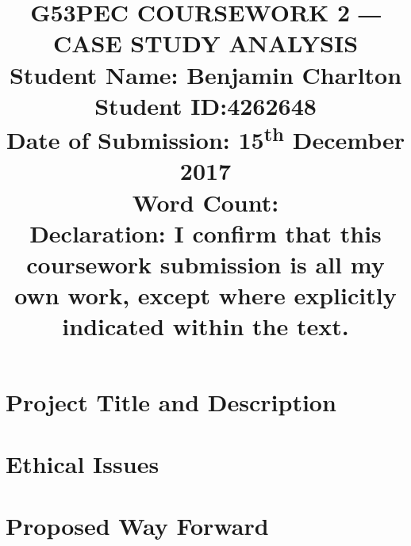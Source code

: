\documentclass[a4paper]{article}
\begin{document}
\title{
    G53PEC COURSEWORK 2 ― CASE STUDY ANALYSIS \\
    \large{Student Name: Benjamin Charlton \\
            Student ID:\@ 4262648 \\
            Date of Submission: 15\textsuperscript{th} December 2017\\
            Word Count: \\
            Declaration: I confirm that this coursework submission is all my own work, except where explicitly indicated within the text.}
    \date{}}
\maketitle

\section*{Project Title and Description}

\section*{Ethical Issues}

\section*{Proposed Way Forward}

\nocite{worldsOverview}


\end{document}
